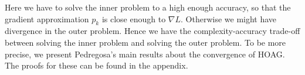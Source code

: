 \documentclass[11pt, twoside]{report}
\begin{document}
\begin{algorithm}[H]
 \caption{HOAG Method}
 \label{alg:hoag}
\end{algorithm}


    
Here we have to solve the inner problem to a high enough accuracy, so that the gradient approximation $p_k$ is close enough to $\nabla L$. Otherwise we might have divergence in the outer problem. Hence we have the complexity-accuracy trade-off between solving the inner problem and solving the outer problem. To be more precise, we present Pedregosa's main results about the convergence of HOAG. The proofs for these can be found in the appendix.
\end{document}

